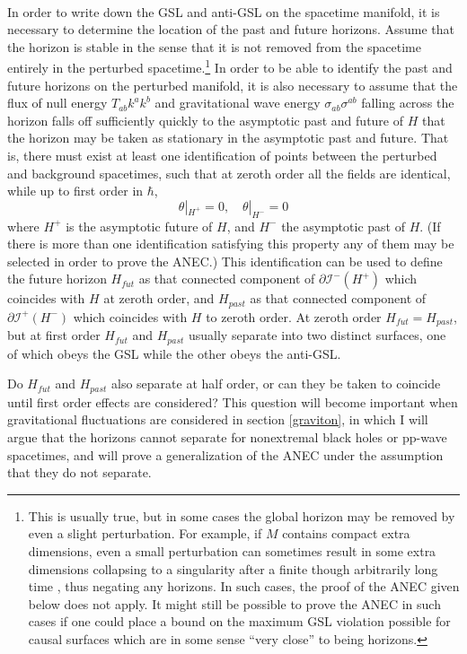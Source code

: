 \documentclass{article}
\begin{document}
\paragraph{}
In order to write down the GSL and anti-GSL on the spacetime manifold, it is necessary to determine the location of the past and future horizons.  Assume that the horizon is stable in the sense that it is not removed from the spacetime entirely in the perturbed spacetime.\footnote{This is usually true, but in some cases the global horizon may be removed by even a slight perturbation.  For example, if $M$ contains compact extra dimensions, even a small perturbation can sometimes result in some extra dimensions collapsing to a singularity after a finite though arbitrarily long time \cite{penrose03}, thus negating any horizons.  In such cases, the proof of the ANEC given below does not apply.  It might still be possible to prove the ANEC in such cases if one could place a bound on the maximum GSL violation possible for causal surfaces which are in some sense ``very close'' to being horizons.}  In order to be able to identify the past and future horizons on the perturbed manifold, it is also necessary to assume that the flux of null energy $T_{ab} k^a k^b$ and gravitational wave energy $\sigma_{ab}\sigma^{ab}$ falling across the horizon falls off sufficiently quickly to the asymptotic past and future of $H$ that the horizon may be taken as stationary in the asymptotic past and future.  That is, there must exist at least one identification of points between the perturbed and background spacetimes, such that at zeroth order all the fields are identical, while up to first order in $\hbar$,
\begin{equation}\label{bound}
\theta |_{H^+} = 0,\quad \theta |_{H^-} = 0
\end{equation}
where $H^+$ is the asymptotic future of $H$, and $H^-$ the asymptotic past of $H$.  (If there is more than one identification satisfying this property any of them may be selected in order to prove the ANEC.)  This identification can be used to define the future horizon $H_{fut}$ as that connected component of $\partial \mathcal{I}^-(H^+)$ which coincides with $H$ at zeroth order, and $H_{past}$ as that connected component of $\partial \mathcal{I}^+(H^-)$ which coincides with $H$ to zeroth order.  At zeroth order $H_{fut} = H_{past}$, but at first order $H_{fut}$ and $H_{past}$ usually separate into two distinct surfaces, one of which obeys the GSL while the other obeys the anti-GSL.

Do $H_{fut}$ and $H_{past}$ also separate at half order, or can they be taken to coincide until first order effects are considered?  This question will become important when gravitational fluctuations are considered in section \ref{graviton}, in which I will argue that the horizons cannot separate for nonextremal black holes or pp-wave spacetimes, and will prove a generalization of the ANEC under the assumption that they do not separate.
\end{document}
